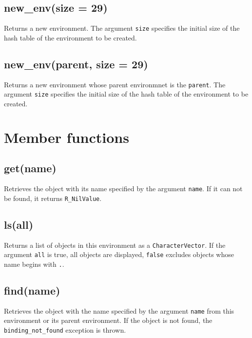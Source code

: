 \documentclass[]{book}
\begin{document}
\hypertarget{new_envsize-29}{%
\subsection{new\_env(size = 29)}\label{new_envsize-29}}

Returns a new environment. The argument \texttt{size} specifies the initial size of the hash table of the environment to be created.

\hypertarget{new_envparent-size-29}{%
\subsection{new\_env(parent, size = 29)}\label{new_envparent-size-29}}

Returns a new environment whose parent environmnet is the \texttt{parent}. The argument \texttt{size} specifies the initial size of the hash table of the environment to be created.

\hypertarget{member-functions-8}{%
\section{Member functions}\label{member-functions-8}}

\hypertarget{getname}{%
\subsection{get(name)}\label{getname}}

Retrieves the object with its name specified by the argument \texttt{name}. If it can not be found, it returns \texttt{R\_NilValue}.

\hypertarget{lsall}{%
\subsection{ls(all)}\label{lsall}}

Returns a list of objects in this environment as a \texttt{CharacterVector}. If the argument \texttt{all} is true, all objects are displayed, \texttt{false} excludes objects whose name begins with \texttt{.}.

\hypertarget{findname}{%
\subsection{find(name)}\label{findname}}

Retrieves the object with the name specified by the argument \texttt{name} from this environment or its parent environment. If the object is not found, the \texttt{binding\_not\_found} exception is thrown.
\end{document}
